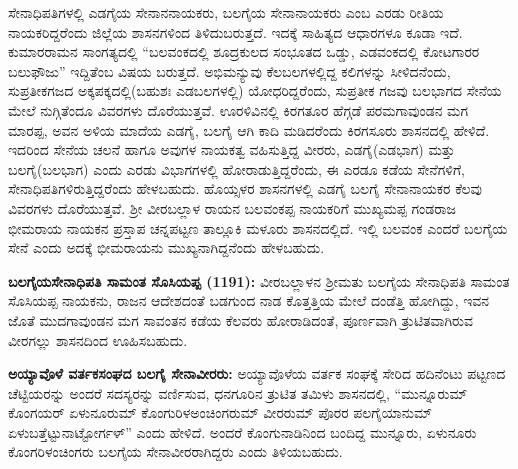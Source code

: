ಸೇನಾಧಿಪತಿಗಳಲ್ಲಿ ಎಡಗೈಯ ಸೇನಾನನಾಯಕರು, ಬಲಗೈಯ ಸೇನಾನಾಯಕರು ಎಂಬ ಎರಡು ರೀತಿಯ ನಾಯಕರಿದ್ದ\-ರೆಂದು ಜಿಲ್ಲೆಯ ಶಾಸನಗಳಿಂದ ತಿಳಿದುಬರುತ್ತದೆ. ಇದಕ್ಕೆ ಸಾಹಿತ್ಯದ ಆಧಾರಗಳೂ ಕೂಡಾ ಇದೆ. ಕುಮಾರರಾಮನ ಸಾಂಗತ್ಯದಲ್ಲಿ “ಬಲವಂಕದಲ್ಲಿ ಶೂದ್ರಕುಲದ ಸಂಭೂತದ ಒಡ್ಡು, ಎಡವಂಕದಲ್ಲಿ ಕೋಟಗಾರರ ಬಲುಫೌಜು” ಇದ್ದಿತೆಂಬ ವಿಷಯ ಬರುತ್ತದೆ. ಅಭಿಮನ್ಯುವು ಕೆಲಬಲಗಳಲ್ಲಿದ್ದ ಕಲಿಗಳನ್ನು ಸೀಳಿದನೆಂದು, ಸುಪ್ರತೀಕಗಜದ ಅಕ್ಕಪಕ್ಕದಲ್ಲಿ\break (ಬಹುಶಃ ಎಡಬಲಗಳಲ್ಲಿ) ಯೋಧರಿದ್ದರೆಂದು, ಸುಪ್ರತೀಕ ಗಜವು ಬಲಭಾಗದ ಸೇನೆಯ ಮೇಲೆ ನುಗ್ಗಿತೆಂದೂ ವಿವರಗಳು ದೊರೆಯುತ್ತವೆ. ಊರಳಿವಿನಲ್ಲಿ ಕಿರಗತೂರ ಹೆಗ್ಗಡೆ ಪರಮಗಾವುಂಡನ ಮಗ ಮಾರಪ್ಪ, ಅವನ ಅಳಿಯ ಮಾದೆಯ ಎಡಗೈ, ಬಲಗೈ ಆಗಿ ಕಾದಿ ಮಡಿದರೆಂದು ಕಿರಗಸೂರು ಶಾಸನದಲ್ಲಿ ಹೇಳಿದೆ. ಇದರಿಂದ ಸೇನೆಯ ಚಲನೆ ಹಾಗೂ ಅವುಗಳ ನಾಯಕತ್ವ ವಹಿಸುತ್ತಿದ್ದ ವೀರರು, ಎಡಗೈ(ಎಡಭಾಗ) ಮತ್ತು ಬಲಗೈ(ಬಲಭಾಗ) ಎಂದು ಎರಡು ವಿಭಾಗಗಳಲ್ಲಿ ಹೋರಾಡುತ್ತಿದ್ದರೆಂದು, ಈ ಎರಡೂ ಕಡೆಯ ಸೇನೆಗಳಿಗೆ, ಸೇನಾಧಿಪತಿಗಳಿರುತ್ತಿದ್ದರೆಂದು ಹೇಳಬಹುದು. ಹೊಯ್ಸಳರ ಶಾಸನಗಳಲ್ಲಿ ಎಡಗೈ ಬಲಗೈ ಸೇನಾನಾಯಕರ ಕೆಲವು ವಿವರಗಳು ದೊರೆಯುತ್ತವೆ. ಶ‍್ರೀ ವೀರಬಲ್ಲಾಳ ರಾಯನ ಬಲವಂಕಪ್ಪ ನಾಯಕರಿಗೆ ಮುಖ್ಯಮಪ್ಪ ಗಂಡರಾಜ ಭೀಮರಾಯ ನಾಯಕನ ಪ್ರಸ್ತಾಪ ಚನ್ನಪಟ್ಟಣ ತಾಲ್ಲೂಕಿ ಮಳೂರು ಶಾಸನದಲ್ಲಿದೆ. ಇಲ್ಲಿ ಬಲವಂಕ ಎಂದರೆ ಬಲಗೈಯ ಸೇನೆ ಎಂದು ಅದಕ್ಕೆ ಭೀಮರಾಯನು ಮುಖ್ಯನಾಗಿದ್ದನೆಂದು ಹೇಳಬಹುದು.

\textbf{ಬಲಗೈಯಸೇನಾಧಿಪತಿ ಸಾಮಂತ ಸೊಸಿಯಪ್ಪ (1191):} ವೀರಬಲ್ಲಾಳನ ಶ‍್ರೀಮತು ಬಲಗೈಯ ಸೇನಾಧಿಪತಿ ಸಾಮಂತ ಸೊಸಿಯಪ್ಪ ನಾಯಕನು, ರಾಜನ ಆದೇಶದಂತೆ ಬಡಗುಂದ ನಾಡ ಕೊತ್ತತ್ತಿಯ ಮೇಲೆ ದಂಡೆತ್ತಿ ಹೋಗಿದ್ದು, ಇವನ ಜೊತೆ ಮುದಗಾವುಂಡನ ಮಗ ಸಾವಂತನ ಕಡೆಯ ಕೆಲವರು ಹೋರಾಡಿದಂತೆ, ಪೂರ್ಣವಾಗಿ ತ್ರುಟಿತವಾಗಿರುವ ವೀರಗಲ್ಲು ಶಾಸನದಿಂದ ಊಹಿಸಬಹುದು.

\vskip 2pt

\textbf{ಅಯ್ಯಾವೊಳೆ ವರ್ತಕಸಂಘದ ಬಲಗೈ ಸೇನಾವೀರರು:} ಅಯ್ಯಾವೊಳೆಯ ವರ್ತಕ ಸಂಘಕ್ಕೆ ಸೇರಿದ ಹದಿನೆಂಟು ಪಟ್ಟಣದ ಚೆಟ್ಟಿಯರನ್ನು ಅಂದರೆ ಸದಸ್ಯರನ್ನು ವರ್ಣಿಸುವ, ಧನಗೂರಿನ ತ್ರುಟಿತ ತಮಿಳು ಶಾಸನದಲ್ಲಿ, “ಮುನ್ನೂರುಮ್ ಕೊಂಗಯರ್​ ಏಳುನೂರುಮ್ ಕೊಂಗುರಿಳಅಂಚಿಂಗರುಮ್ ವೀರರುಮ್ ಪೊರರ ಪಲಗೈಯಾನುಮ್ ಏಳುಬತ್ತೆಟ್ಟು\break ನಾಟ್ಟೋರ್ಗಳ್​” ಎಂದು ಹೇಳಿದೆ. ಅಂದರೆ ಕೊಂಗುನಾಡಿನಿಂದ ಬಂದಿದ್ದ ಮುನ್ನೂರು, ಏಳುನೂರು ಕೊಂಗರಿಳಂಚಿಂಗರು ಬಲಗೈಯ ಸೇನಾವೀರರಾಗಿದ್ದರು ಎಂದು ತಿಳಿಯಬಹುದು.

